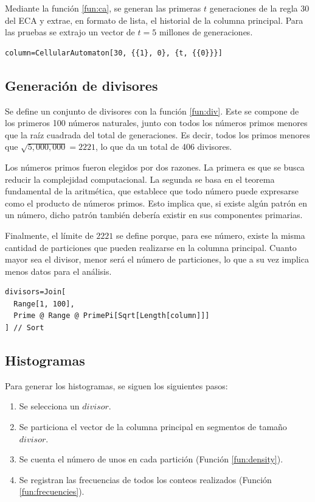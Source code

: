 \documentclass[12pt,twoside]{article}
\begin{document}
	Mediante la función \ref{fun:ca}, se generan las primeras $t$ generaciones de la regla 30 del ECA y extrae, en formato de lista, el historial de la columna principal. Para las pruebas se extrajo un vector de $t=5$ millones de generaciones.
	
\begin{lstlisting}[style=modernMathematica, label=fun:ca, caption={Función extractora de la columna principal}]
column=CellularAutomaton[30, {{1}, 0}, {t, {{0}}}]
\end{lstlisting}

\subsection{Generación de divisores}

Se define un conjunto de divisores con la función \ref{fun:div}. Este se compone de los primeros 100 números naturales, junto con todos los números primos menores que la raíz cuadrada del total de generaciones. Es decir, todos los primos menores que $\sqrt{5,000,000} = 2221$, lo que da un total de 406 divisores.  

Los números primos fueron elegidos por dos razones. La primera es que se busca reducir la complejidad computacional. La segunda se basa en el teorema fundamental de la aritmética, que establece que todo número puede expresarse como el producto de números primos. Esto implica que, si existe algún patrón en un número, dicho patrón también debería existir en sus componentes primarias.  

Finalmente, el límite de $2221$ se define porque, para ese número, existe la misma cantidad de particiones que pueden realizarse en la columna principal. Cuanto mayor sea el divisor, menor será el número de particiones, lo que a su vez implica menos datos para el análisis.

\begin{lstlisting}[style=modernMathematica, label=fun:div, caption={Selección de divisores}]
divisors=Join[
  Range[1, 100],
  Prime @ Range @ PrimePi[Sqrt[Length[column]]]
] // Sort
\end{lstlisting}
	
\subsection{Histogramas}

	Para generar los histogramas, se siguen los siguientes pasos:
	\begin{enumerate}
		\item Se selecciona un $divisor$.
		\item Se particiona el vector de la columna principal en segmentos de tamaño $divisor$.
		\item Se cuenta el número de unos en cada partición (Función \ref{fun:density}).
		\item Se registran las frecuencias de todos los conteos realizados (Función \ref{fun:frecuencies}).
	\end{enumerate}
	
\end{document}
